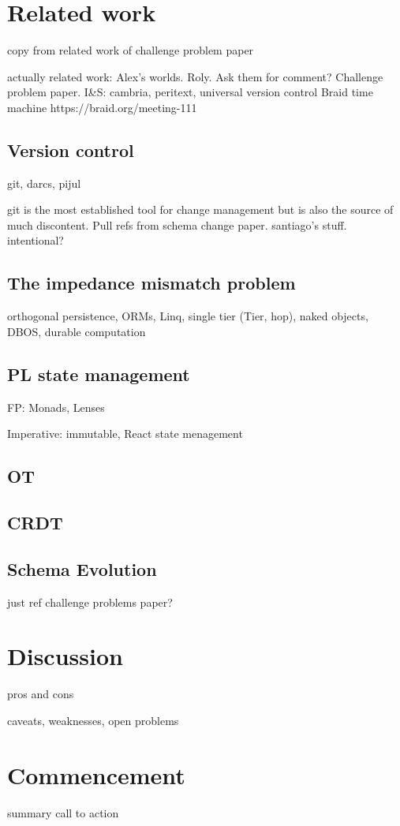 \documentclass[english,submission]{programming}
\begin{document}
\section{Related work}

copy from related work of challenge problem paper

actually related work:
Alex's worlds. Roly. Ask them for comment?
Challenge problem paper.
I\&S: cambria, peritext, universal version control
Braid time machine https://braid.org/meeting-111

\subsection{Version control}\label{VC}

git, darcs, pijul

git is the most established tool for change management but is also the source of much discontent. Pull refs from schema change paper. santiago's stuff. intentional?

\subsection{The impedance mismatch problem} \label{impedance}

orthogonal persistence, ORMs, Linq, single tier (Tier, hop), naked objects, DBOS, durable computation

\subsection{PL state management}\label{PLstate}

FP: Monads, Lenses

Imperative: immutable, React state menagement

\subsection{OT}\label{OT}

\subsection{CRDT}\label{CRDT}

\subsection{Schema Evolution}\label{schema}
just ref challenge problems paper?








\section{Discussion}
pros and cons

caveats, weaknesses, open problems

\section{Commencement}
summary
call to action

\printbibliography
\end{document}
